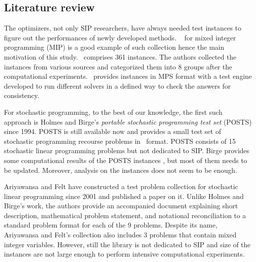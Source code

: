 \subsection{Literature review} \label{subsec:literaturereview}
The optimizers, not only SIP researchers, have always needed test instances to figure out the performances of newly developed methods. \miplib\ \cite{MIPLIB} for mixed integer programming (MIP) is a good example of such collection hence the main motivation of this study. \miplib\ comprises 361 instances. The authors collected the instances from various sources and categorized them into 8 groups after the computational experiments. \miplib\ provides instances in \textsf{MPS} format with a test engine developed to run different solvers in a defined way to check the answers for consistency. 

For stochastic programming, to the best of our knowledge, the first such approach is Holmes and Birge's \textit{portable stochastic programming test set} (POSTS) \cite{POSTS} since 1994. POSTS is still available now and provides a small test set of stochastic programming recourse problems in \smps\ format. POSTS consists of 15 stochastic linear programming problems but not dedicated to SIP. Birge provides some computational results of the POSTS instances \cite{POSTSresults}, but most of them needs to be updated. Moreover, analysis on the instances does not seem to be enough. 

Ariyawansa and Felt \cite{AF2004} have constructed a test problem collection for stochastic linear programming since 2001 and published a paper on it. Unlike Holmes and Birge's work, the authors provide an accompanied document explaining short description, mathematical problem statement, and notational reconciliation to a standard problem format for each of the 9 problems. Despite its name, Ariyawansa and Felt's collection also includes 3 problems that contain mixed integer variables. However, still the library is not dedicated to SIP and size of the instances are not large enough to perform intensive computational experiments. 

